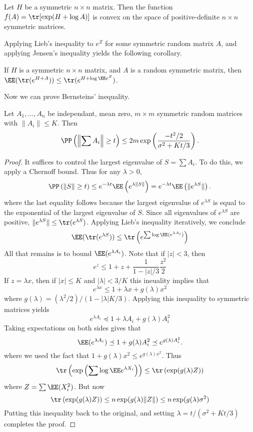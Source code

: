 \begin{theorem}
    Let $H$ be a symmetric $n \times n$ matrix. Then the function $f(A) = \tr[\exp(H + \log A)]$ is convex on the space of positive-definite $n \times n$ symmetric matrices.
\end{theorem}

Applying Lieb's inequality to $e^Z$ for some symmetric random matrix $A$, and applying Jensen's inequality yields the following corollary.

\begin{corollary}
    If $H$ is a symmetric $n \times n$ matrix, and $A$ is a random symmetric matrix, then $\EE(\tr(e^{H + A})) \leq \tr(e^{H + \log \EE e^Z})$.
\end{corollary}

Now we can prove Bernsteins' inequality.

\begin{theorem}
    Let $A_1, \dots, A_n$ be independant, mean zero, $m \times m$ symmetric random matrices with $\| A_i \| \leq K$. Then
    \[ \PP \left( \left\| \sum A_i \right\| \geq t \right) \leq 2m \exp \left( \frac{-t^2/2}{\sigma^2 + Kt/3} \right). \]
\end{theorem}
\begin{proof}
    It suffices to control the largest eigenvalue of $S = \sum A_i$. To do this, we apply a Chernoff bound. Thus for any $\lambda > 0$,
    \[ \PP \left( \| S \| \geq t \right) \leq e^{- \lambda t} \EE \left( e^{\lambda \| S \|} \right) = e^{-\lambda t} \EE \left( \| e^{\lambda S} \| \right). \]
    where the last equality follows because the largest eigenvalue of $e^{\lambda S}$ is equal to the exponential of the largest eigenvalue of $S$. Since all eigenvalues of $e^{\lambda S}$ are positive, $\| e^{\lambda S} \| \leq \tr(e^{\lambda S})$. Applying Lieb's inequality iteratively, we conclude
    \[ \EE(\tr(e^{\lambda S})) \leq \tr \left( e^{\sum \log \EE(e^{\lambda A_i})} \right) \]
    All that remains is to bound $\EE(e^{\lambda A_i})$. Note that if $|z| < 3$, then
    \[ e^z \leq 1 + z + \frac{1}{1 - |z|/3} \frac{z^2}{2} \]
    If $z = \lambda x$, then if $|x| \leq K$ and $|\lambda| < 3/K$ this ineuality implies that
    \[ e^{\lambda x} \leq 1 + \lambda x + g(\lambda) x^2 \]
    where $g(\lambda) = (\lambda^2/2)/(1 - |\lambda|K/3)$. Applying this inequality to symmetric matrices yields
    \[ e^{\lambda A_i} \preceq 1 + \lambda A_i + g(\lambda) A_i^2 \]
    Taking expectations on both sides gives that
    \[ \EE(e^{\lambda A_i}) \preceq 1 + g(\lambda) A_i^2 \preceq e^{g(\lambda) A_i^2}. \]
    where we used the fact that $1 + g(\lambda) x^2 \leq e^{g(\lambda) x^2}$. Thus
    \[ \tr \left( \exp \left( \sum \log \EE e^{\lambda X_i} \right) \right) \leq \tr \left( \exp(g(\lambda) Z) \right) \]
    where $Z = \sum \EE(X_i^2)$. But now
    \[ \tr \left( \exp(g(\lambda) Z) \right) \leq n \exp(g(\lambda) \| Z \|) \leq n \exp(g(\lambda) \sigma^2) \]
    Putting this inequality back to the original, and setting $\lambda = t/(\sigma^2 + Kt/3)$ completes the proof.
\end{proof}

